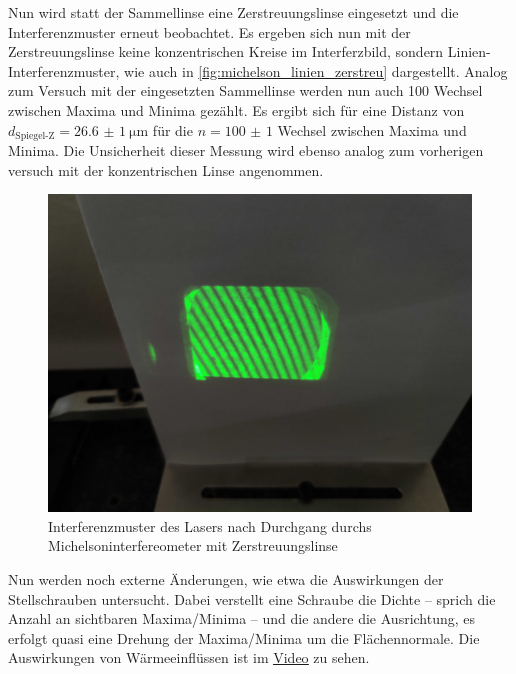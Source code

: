 \documentclass[ngerman]{scrartcl}
\begin{document}
Nun wird statt der Sammellinse eine Zerstreuungslinse eingesetzt und die Interferenzmuster erneut beobachtet. Es ergeben sich nun mit der Zerstreuungslinse keine konzentrischen Kreise im Interferzbild, sondern Linien-Interferenzmuster, wie auch in \autoref{fig:michelson_linien_zerstreu} dargestellt.
Analog zum Versuch mit der eingesetzten Sammellinse werden nun auch 100 Wechsel zwischen Maxima und Minima gezählt. Es ergibt sich für eine Distanz von $d_\text{Spiegel-Z} = \SI{26.6(10)}{\micro\meter}$ für die $n = \num{100(1)}$ Wechsel zwischen Maxima und Minima. Die Unsicherheit dieser Messung wird ebenso analog zum vorherigen versuch mit der konzentrischen Linse angenommen.
\begin{figure}[H]
    \centering
    \begin{samepage}
        \includegraphics[width=0.7\linewidth]{fig/Compressed/Zerstreuungslinse.jpg}
        \caption{Interferenzmuster des Lasers nach Durchgang durchs Michelsoninterfereometer mit Zerstreuungslinse}
        \label{fig:michelson_linien_zerstreu}
    \end{samepage}
\end{figure}

Nun werden noch externe Änderungen, wie etwa die Auswirkungen der Stellschrauben untersucht. Dabei verstellt eine Schraube die Dichte -- sprich die Anzahl an sichtbaren Maxima/Minima -- und die andere die Ausrichtung, es erfolgt quasi eine Drehung der Maxima/Minima um die Flächennormale.
Die Auswirkungen von Wärmeeinflüssen ist im \underline{\href{https://etschgi1.github.io/files/UNI_hosting/Misc/FP2/Interferometrie/Stoerungen.mp4}{Video}} zu sehen.
\end{document}

